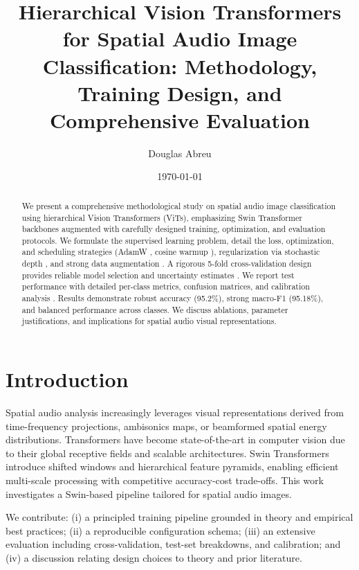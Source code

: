 \documentclass[11pt,a4paper]{article}
\title{Hierarchical Vision Transformers for Spatial Audio Image Classification: Methodology, Training Design, and Comprehensive Evaluation}
\author[1]{Douglas Abreu}
\affil[1]{Ph.D. Program, Department of Computer Science, \textit{Institution}}
\date{\today}
\begin{document}
\maketitle

\begin{abstract}
We present a comprehensive methodological study on spatial audio image classification using hierarchical Vision Transformers (ViTs), emphasizing Swin Transformer backbones \cite{liu2021swin} augmented with carefully designed training, optimization, and evaluation protocols. We formulate the supervised learning problem, detail the loss, optimization, and scheduling strategies (AdamW \cite{loshchilov2017decoupled}, cosine warmup \cite{loshchilov2017sgdr}), regularization via stochastic depth \cite{huang2016stochasticdepth}, and strong data augmentation \cite{shorten2019survey,zhong2020randomerasing}. A rigorous 5-fold cross-validation design provides reliable model selection and uncertainty estimates \cite{kohavi1995cv}. We report test performance with detailed per-class metrics, confusion matrices, and calibration analysis \cite{guo2017calibration}. Results demonstrate robust accuracy (95.2\%), strong macro-F1 (95.18\%), and balanced performance across classes. We discuss ablations, parameter justifications, and implications for spatial audio visual representations.
\end{abstract}

\section{Introduction}
Spatial audio analysis increasingly leverages visual representations derived from time-frequency projections, ambisonics maps, or beamformed spatial energy distributions. Transformers \cite{dosovitskiy2021vit} have become state-of-the-art in computer vision due to their global receptive fields and scalable architectures. Swin Transformers \cite{liu2021swin} introduce shifted windows and hierarchical feature pyramids, enabling efficient multi-scale processing with competitive accuracy-cost trade-offs. This work investigates a Swin-based pipeline tailored for spatial audio images.

We contribute: (i) a principled training pipeline grounded in theory and empirical best practices; (ii) a reproducible configuration schema; (iii) an extensive evaluation including cross-validation, test-set breakdowns, and calibration; and (iv) a discussion relating design choices to theory and prior literature.
\end{document}
